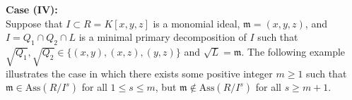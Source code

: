 \documentclass[11pt]{amsart}
\begin{document}

\medskip
\noindent\textbf{Case (IV):} \\
Suppose that  $I \subset R = K[x,y,z]$ is  a monomial ideal, $\mathfrak{m} = (x,y,z)$, and
 $I = Q_1 \cap Q_2 \cap L$ is  a minimal primary decomposition of $I$ such that
$\sqrt{Q_1}, \sqrt{Q_2} \in \{(x,y), (x,z), (y,z)\}$ and $\sqrt{L}=\mathfrak{m}.$
 The following example illustrates the case in which there exists some  positive integer  $m\geq 1$ such that  $\mathfrak{m}\in \mathrm{Ass}(R/I^s)$ for all $1\leq s \leq m$,   but    $\mathfrak{m}\notin \mathrm{Ass}(R/I^s)$ for all $s \geq m+1$. 
\end{document}
